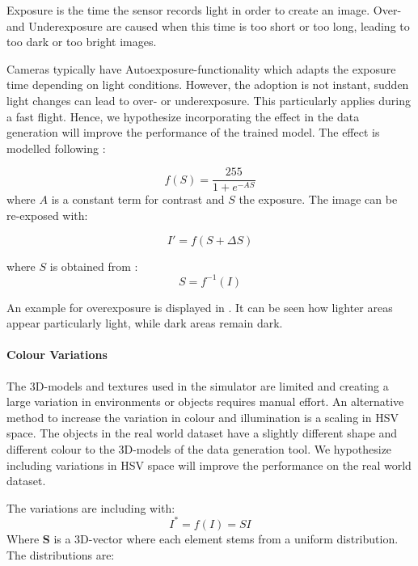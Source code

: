 Exposure is the time the sensor records light in order to create an image. Over- and Underexposure are caused when this time is too short or too long, leading to too dark or too bright images.

Cameras typically have Autoexposure-functionality which adapts the exposure time depending on light conditions. However, the adoption is not instant, sudden light changes can lead to over- or underexposure. This particularly applies during a fast flight. Hence, we hypothesize incorporating the effect in the data generation will improve the performance of the trained model. The effect is modelled following \cite{Carlson2018}:

\begin{equation}
f(S) = \frac{255}{1 + e^{-A S}}
\end{equation}
where $A$ is a constant term for contrast and $S$ the exposure.
The image can be re-exposed with:

\begin{equation}
I' = f(S+\Delta S)
\end{equation}

where $S$ is obtained from :
\begin{equation}
S = f^{-1}(I)
\end{equation}

An example for overexposure is displayed in . It can be seen how lighter areas appear particularly light, while dark areas remain dark.

\paragraph{Colour Variations}

The 3D-models and textures used in the simulator are limited and creating a large variation in environments or objects requires manual effort. An alternative method to increase the variation in colour and illumination is a scaling in HSV space. The objects in the real world dataset have a slightly different shape and different colour to the 3D-models of the data generation tool. We hypothesize including variations in HSV space will improve the performance on the real world dataset.

The variations are including with:
\begin{equation}
I^* = f(I) = S I
\end{equation}
Where \textbf{S} is a 3D-vector where each element stems from a uniform distribution. The distributions are:


